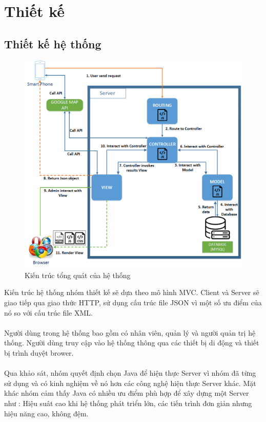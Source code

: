\documentclass[a4paper]{article}
\begin{document}
\newpage
\section{Thiết kế}
\subsection{Thiết kế hệ thống}
\begin{figure}[h]
    \includegraphics[scale=0.5]{architecture}
    \centering
    \caption{Kiến trúc tổng quát của hệ thống}
    \label{fig:architecture}
\end{figure}
\noindent
Kiến trúc hệ thống nhóm thiết kế sẽ dựa theo mô hình MVC. Client và Server sẽ giao tiếp qua giao thức HTTP, sử dụng cấu trúc file JSON vì một số ưu điểm của nó so với cấu trúc file XML.\\
\\
Người dùng trong hệ thống bao gồm có nhân viên, quản lý và người quản trị hệ  thống. Người dùng truy cập vào hệ thống thông qua các thiết bị di động và thiết bị trình duyệt brower.\\
\\
Qua khảo sát, nhóm quyết định chọn Java để hiện thực Server vì nhóm đã từng sử dụng và có kinh nghiệm về nó hơn các công nghệ hiện thực Server khác. Mặt khác nhóm cảm thấy Java có nhiều ưu điểm phù hợp để xây dựng một Server như : Hiệu suât cao khi hệ thống phát triển lớn, các tiến trình đơn giản nhưng hiệu năng cao, không đệm.\\\\
\end{document}
